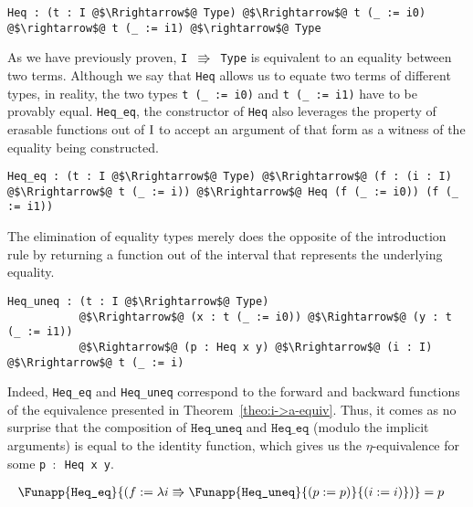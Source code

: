 \documentclass[12pt,twoside,maitrise]{dms}
\theoremstyle{definition}
\numberwithin{equation}{section}
\numberwithin{table}{chapter}
\numberwithin{figure}{chapter}
\newcommand\id[1] {\texttt{#1}}
\newcommand\fn[1] {\texttt{#1}}
\begin{document}
\begin{verbatim}
Heq : (t : I @$\Rrightarrow$@ Type) @$\Rrightarrow$@ t (_ := i0) @$\rightarrow$@ t (_ := i1) @$\rightarrow$@ Type
\end{verbatim}

As we have previously proven, \fn{I $\Rrightarrow$ Type} is equivalent to an
equality between two terms. Although we say that \fn{Heq} allows us to equate
two terms of different types, in reality, the two types \fn{t (\_ := i0)} and
\fn{t (\_ := i1)} have to be provably equal. \id{Heq\_eq}, the constructor of
\id{Heq} also leverages the property of erasable functions out of $\mathrm{I}$ to
accept an argument of that form as a witness of the equality being constructed.


\begin{verbatim}
Heq_eq : (t : I @$\Rrightarrow$@ Type) @$\Rrightarrow$@ (f : (i : I) @$\Rrightarrow$@ t (_ := i)) @$\Rrightarrow$@ Heq (f (_ := i0)) (f (_ := i1))
\end{verbatim}

The elimination of equality types merely does the opposite of the introduction
rule by returning a function out of the interval that represents the underlying
equality.

\begin{verbatim}
Heq_uneq : (t : I @$\Rrightarrow$@ Type)
           @$\Rrightarrow$@ (x : t (_ := i0)) @$\Rightarrow$@ (y : t (_ := i1))
           @$\Rightarrow$@ (p : Heq x y) @$\Rrightarrow$@ (i : I) @$\Rrightarrow$@ t (_ := i)
\end{verbatim}

Indeed, \id{Heq\_eq} and \id{Heq\_uneq} correspond to the forward and backward
functions of the equivalence presented in Theorem~\ref{theo:i->a-equiv}. Thus,
it comes as no surprise that the composition of $\id{Heq\_uneq}$ and
$\id{Heq\_eq}$ (modulo the implicit arguments) is equal to the identity
function, which gives us the $\eta$-equivalence for some \fn{p $\colon$ Heq x y}.

\begin{align*}
  & \Funapp{\id{Heq\_eq}}{(\earg{f}{\lambda i \Rrightarrow
      \Funapp{\id{Heq\_uneq}}{(\earg{p}{p})}{(\earg{i}{i})}})} = p
\end{align*}
\end{document}
